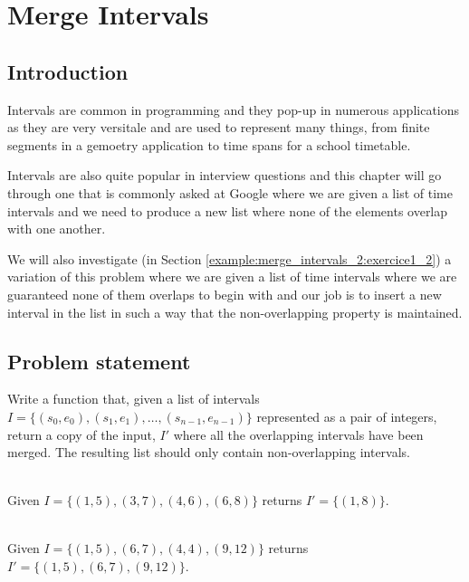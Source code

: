 %



\chapter{Merge Intervals}
\label{ch:merge_intervals_2}
\section*{Introduction}
Intervals are common in programming and they pop-up in numerous applications as they are very versitale and are used to represent many things, from finite segments in a gemoetry application to time spans for a school timetable.

Intervals are also quite popular in interview questions and this chapter will go through one that is commonly asked at Google where we are given a list of time intervals and we need to produce a new list where none of the elements overlap with one another.

We will also investigate (in Section \ref{example:merge_intervals_2:exercice1_2}) a variation of this problem where we are given a list of time intervals where we are guaranteed none of them overlaps to begin with and our job is to insert a new interval in the list in such a way that the non-overlapping property is maintained.

\section{Problem statement}
\begin{exercise}
\label{example:merge_intervals_2:exercice1_1}
Write a function that, given a list of intervals $I=\{(s_0, e_0),(s_1, e_1), \ldots,(s_{n-1}, e_{n-1})\}$ represented as a pair of integers, return a copy of the input, $I'$ where all the overlapping intervals have been merged. The resulting list should only contain non-overlapping intervals.

	\begin{example}
		\label{example:merge_intervals_2:example1_1}
		\hfill \\
		Given $I=\{(1, 5), (3, 7), (4, 6), (6, 8) \}$ returns $I'=\{(1,8)\}$.
	\end{example}

	\begin{example}
		\label{example:merge_intervals_2:example1_2}
		\hfill \\
		Given $I=\{(1, 5), (6, 7), (4, 4), (9, 12) \}$ returns $I'=\{(1,5),(6,7),(9,12)\}$.
	\end{example}
\end{exercise}


